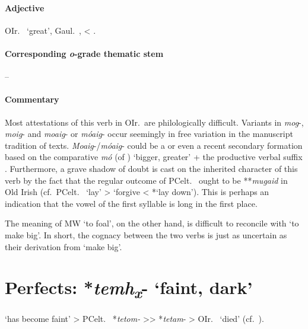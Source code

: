 \documentclass[output=paper,colorlinks,citecolor=brown]{langscibook}
\begin{document}
\paragraph*{Adjective}

OIr.\   ‘great’, Gaul.\ ,  < .

\paragraph*{Corresponding \textit{o}-grade thematic stem}  -- 

\paragraph*{Commentary} 

Most attestations of this verb in OIr.\  are philologically difficult. Variants in \textit{mog}-, \textit{moig}- and \textit{moaig}- or \textit{móaig}- occur seemingly in free variation in the manuscript tradition of texts.   \textit{Moaig}-/\textit{móaig}- could be a  or even a recent secondary formation based on the comparative \textit{mó} (of ) ‘bigger, greater’ + the productive verbal suffix . Furthermore, a grave shadow of doubt is cast on the inherited character of this verb by the fact that the regular outcome of PCelt.\  ought to be **\textit{mugaid} in Old Irish (cf.\ PCelt.\  ‘lay’ >  ‘forgive < *‘lay down’). This is perhaps an indication that the vowel of the first syllable is long in the first place.

The meaning of MW  ‘to foal’, on the other hand, is difficult to reconcile with ‘to make big’. In short, the cognacy between the two verbs is just as uncertain as their derivation from  ‘make big’.

\section{Perfects: *\textit{temh\textsubscript{x}}- ‘faint, dark’}
\label{sec:CelticPerf}


 ‘has become faint’ > PCelt.\  *\textit{tetom-} >{>} *\textit{tetam}- > OIr.\   ‘died’ (cf.\ \citealt[68--79; 634--635]{Schumacher2004}).
\end{document}
